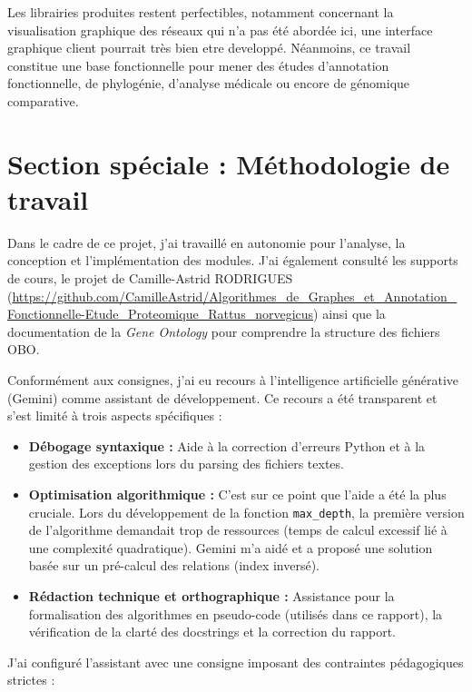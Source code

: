 \documentclass[12pt,a4paper]{article}
\begin{document}
Les librairies produites restent perfectibles, notamment concernant la visualisation graphique des réseaux qui n'a pas été abordée ici, une interface graphique client pourrait très bien etre developpé. Néanmoins, ce travail constitue une base fonctionnelle pour mener des études d'annotation fonctionnelle, de phylogénie, d'analyse médicale ou encore de génomique comparative.

\section{Section spéciale : Méthodologie de travail}

Dans le cadre de ce projet, j'ai travaillé en autonomie pour l'analyse, la conception et l'implémentation des modules. J'ai également consulté les supports de cours, le projet de Camille-Astrid RODRIGUES (\url{https://github.com/CamilleAstrid/Algorithmes_de_Graphes_et_Annotation_Fonctionnelle-Etude_Proteomique_Rattus_norvegicus}) ainsi que la documentation de la \textit{Gene Ontology} pour comprendre la structure des fichiers OBO.

Conformément aux consignes, j'ai eu recours à l'intelligence artificielle générative (Gemini) comme assistant de développement. Ce recours a été transparent et s'est limité à trois aspects spécifiques :

\begin{itemize}
    \item \textbf{Débogage syntaxique :} Aide à la correction d'erreurs Python et à la gestion des exceptions lors du parsing des fichiers textes.
    \item \textbf{Optimisation algorithmique :} C'est sur ce point que l'aide a été la plus cruciale. Lors du développement de la fonction \texttt{max\_depth}, la première version de l'algorithme demandait trop de ressources (temps de calcul excessif lié à une complexité quadratique). Gemini m'a aidé et a proposé une solution basée sur un pré-calcul des relations (index inversé).
    \item \textbf{Rédaction technique et orthographique :} Assistance pour la formalisation des algorithmes en pseudo-code (utilisés dans ce rapport), la vérification de la clarté des docstrings et la correction du rapport.
\end{itemize}

J'ai configuré l'assistant avec une consigne imposant des contraintes pédagogiques strictes :
\end{document}
